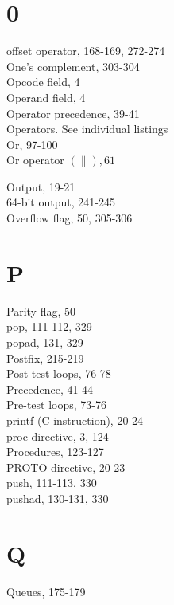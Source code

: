 \documentclass[10pt]{article}
\begin{document}
\section*{0}
offset operator, 168-169, 272-274\\
One's complement, 303-304\\
Opcode field, 4\\
Operand field, 4\\
Operator precedence, 39-41\\
Operators. See individual listings\\
Or, 97-100\\
Or operator $(\|), 61$

Output, 19-21\\
64-bit output, 241-245\\
Overflow flag, 50, 305-306

\section*{P}
Parity flag, 50\\
pop, 111-112, 329\\
popad, 131, 329\\
Postfix, 215-219\\
Post-test loops, 76-78\\
Precedence, 41-44\\
Pre-test loops, 73-76\\
printf (C instruction), 20-24\\
proc directive, 3, 124\\
Procedures, 123-127\\
PROTO directive, 20-23\\
push, 111-113, 330\\
pushad, 130-131, 330

\section*{Q}
Queues, 175-179
\end{document}
